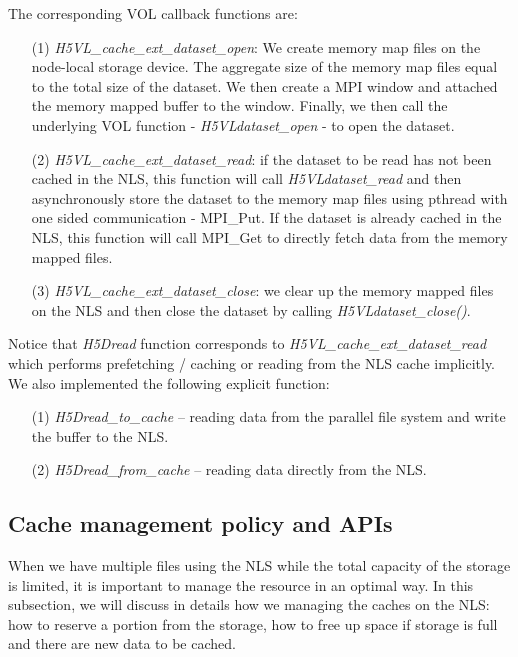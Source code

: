 \documentclass[aps, rmp, 11pt, notitlepage]{revtex4-1}
\begin{document}
The corresponding VOL callback functions are: 
\begin{itemize}
\item [(1)] \textit{H5VL\_cache\_ext\_dataset\_open}: We create memory map files on the node-local storage device. The aggregate size of the memory map files equal to the total size of the dataset. We then create a MPI window and attached the memory mapped buffer to the window. Finally, we then call the underlying VOL function - \textit{H5VLdataset\_open} - to open the dataset. 
\item [(2)] \textit{H5VL\_cache\_ext\_dataset\_read}: if the dataset to be read has not been cached in the NLS, this function will call \textit{H5VLdataset\_read} and then asynchronously store the dataset to the memory map files using pthread with one sided communication - MPI\_Put. If the dataset is already cached in the NLS, this function will call MPI\_Get to directly fetch data from the memory mapped files. 
\item [(3)] \textit{H5VL\_cache\_ext\_dataset\_close}: we clear up the memory mapped files on the NLS and then close the dataset by calling \textit{H5VLdataset\_close()}. 
\end{itemize}
Notice that \textit{H5Dread} function corresponds to \textit{H5VL\_cache\_ext\_dataset\_read} which performs prefetching / caching or reading from the NLS cache implicitly. We also implemented the following explicit function: 
\begin{itemize}
\item [(1)] \textit{H5Dread\_to\_cache} -- reading data from the parallel file system and write the buffer to the NLS. 
\item [(2)] \textit{H5Dread\_from\_cache} -- reading data directly from the NLS.
\end{itemize}

\subsection{Cache management policy and APIs}
When we have multiple files using the NLS while the total capacity of the storage is limited, it is important to manage the resource in an optimal way. In this subsection, we will discuss in details how we managing the caches on the NLS: how to reserve a portion from the storage, how to free up space if storage is full and there are new data to be cached. 
\end{document}
